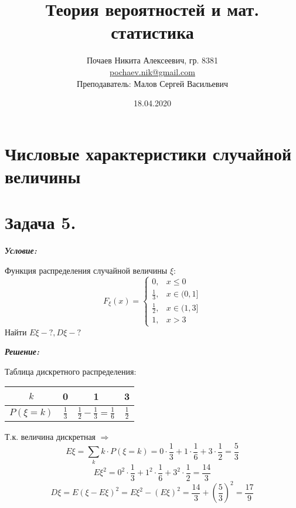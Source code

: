 

\title{Теория вероятностей и мат. статистика}
\date{18.04.2020}
\author{Почаев Никита Алексеевич, гр. 8381 \\ \href{mailto:pochaev.nik@gmail.com}{pochaev.nik@gmail.com} \\ Преподаватель: Малов Сергей Васильевич}


	
\renewcommand{\figurename}{Рисунок}

\maketitle

\section*{Числовые характеристики случайной величины}

\section*{Задача 5.}

\noindent\textit{\textbf{Условие:}}

Функция распределения случайной величины $\xi$:
\[
F_{\xi} (x) =
\begin{cases}
	0, &x \le 0 \\
	\frac{1}{3}, &x \in (0, 1] \\
	\frac{1}{2}, &x \in (1, 3] \\
	1, &x >3
\end{cases}
\]
Найти $E\xi - ?, D\xi - ?$

\noindent\textit{\textbf{Решение:}}

Таблица дискретного распределения:
\begin{table}[H]
	\centering\makegapedcells
	\begin{tabular}{|c|c|c|c|}
		\hline
		$k$        & 0             & 1                                     & 3             \\ \hline
		$P(\xi=k)$ & $\frac{1}{3}$ & $\frac{1}{2}-\frac{1}{3}=\frac{1}{6}$ & $\frac{1}{2}$ \\ \hline
	\end{tabular}
\end{table}
Т.к. величина дискретная $\Rightarrow$
\[
E\xi = \sum_{k} k \cdot P(\xi = k) = 0 \cdot \frac{1}{3} + 1 \cdot \frac{1}{6} + 3 \cdot \frac{1}{2} = \frac{5}{3}
\]
\[
E\xi^2 = 0^2 \cdot \frac{1}{3} + 1^2 \cdot \frac{1}{6} + 3^2 \cdot \frac{1}{2} = \frac{14}{3}
\]
\[
D\xi = E(\xi - E\xi)^2 = E\xi^2 - (E\xi)^2 = \frac{14}{3} + \left( \frac{5}{3} \right)^2 = \frac{17}{9}
\]

